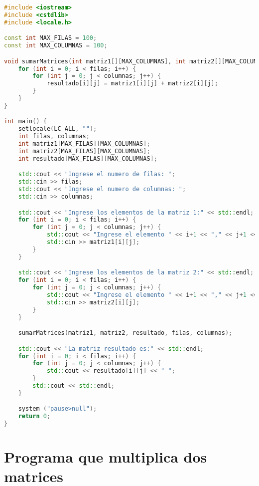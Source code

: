 \noindent
\begin{lstlisting}[language=C++]
#include <iostream>
#include <cstdlib>
#include <locale.h>

const int MAX_FILAS = 100;
const int MAX_COLUMNAS = 100;

void sumarMatrices(int matriz1[][MAX_COLUMNAS], int matriz2[][MAX_COLUMNAS], int resultado[][MAX_COLUMNAS], int filas, int columnas) {
    for (int i = 0; i < filas; i++) {
        for (int j = 0; j < columnas; j++) {
            resultado[i][j] = matriz1[i][j] + matriz2[i][j];
        }
    }
}

int main() {
    setlocale(LC_ALL, "");
    int filas, columnas;
    int matriz1[MAX_FILAS][MAX_COLUMNAS];
    int matriz2[MAX_FILAS][MAX_COLUMNAS];
    int resultado[MAX_FILAS][MAX_COLUMNAS];

    std::cout << "Ingrese el numero de filas: ";
    std::cin >> filas;
    std::cout << "Ingrese el numero de columnas: ";
    std::cin >> columnas;

    std::cout << "Ingrese los elementos de la matriz 1:" << std::endl;
    for (int i = 0; i < filas; i++) {
        for (int j = 0; j < columnas; j++) {
            std::cout << "Ingrese el elemento " << i+1 << "," << j+1 << ": ";
            std::cin >> matriz1[i][j];
        }
    }

    std::cout << "Ingrese los elementos de la matriz 2:" << std::endl;
    for (int i = 0; i < filas; i++) {
        for (int j = 0; j < columnas; j++) {
            std::cout << "Ingrese el elemento " << i+1 << "," << j+1 << ": ";
            std::cin >> matriz2[i][j];
        }
    }

    sumarMatrices(matriz1, matriz2, resultado, filas, columnas);

    std::cout << "La matriz resultado es:" << std::endl;
    for (int i = 0; i < filas; i++) {
        for (int j = 0; j < columnas; j++) {
            std::cout << resultado[i][j] << " ";
        }
        std::cout << std::endl;
    }

	system ("pause>null");
	return 0;
}

\end{lstlisting}

\section*{Programa que multiplica dos matrices}


